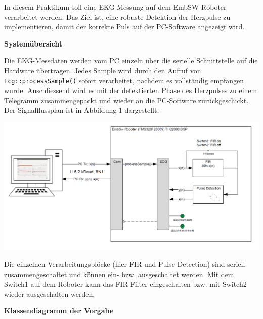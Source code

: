 In diesem Praktikum soll eine EKG-Messung auf dem EmbSW-Roboter verarbeitet werden. Das Ziel ist, eine
robuste Detektion der Herzpulse zu implementieren, damit der korrekte Puls auf der PC-Software angezeigt
wird.

\medskip
\textbf{Systemübersicht}
\medskip

Die EKG-Messdaten werden vom PC einzeln über die serielle Schnittstelle auf die Hardware übertragen. Jedes
Sample wird durch den Aufruf von \texttt{Ecg::processSample()} sofort verarbeitet, nachdem es vollständig
empfangen wurde. Anschliessend wird es mit der detektierten Phase des Herzpulses zu einem Telegramm
zusammengepackt und wieder an die PC-Software zurückgeschickt. Der Signalflussplan ist in Abbildung 1
dargestellt.

\begin{center}
  \includegraphics[width=.8\linewidth]{900-Praktika/prak08/1.PNG}
\end{center}

Die einzelnen Verarbeitungsblöcke (hier FIR und Pulse Detection) sind seriell zusammengeschaltet und können
ein- bzw. ausgeschaltet werden. Mit dem Switch1 auf dem Roboter kann das FIR-Filter eingeschalten
bzw. mit Switch2 wieder ausgeschalten werden.

\medskip
\textbf{Klassendiagramm der Vorgabe}

